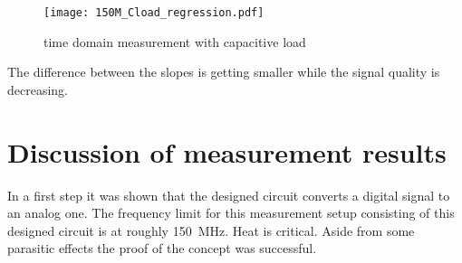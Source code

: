 \begin{figure}[htb!]
	\centering
  \texttt{[image: 150M\_Cload\_regression.pdf]}
	\caption{time domain measurement with capacitive load}
	\label{fig:measCload150M}
\end{figure}

The difference between the slopes is getting smaller while the signal quality is decreasing.


\section{Discussion of measurement results}
In a first step it was shown that the designed circuit converts a digital signal to an analog one.
The frequency limit for this measurement setup consisting of this designed circuit is at roughly \SI{150}{\mega \hertz}.
Heat is critical. 
Aside from some parasitic effects the proof of the concept was successful.


